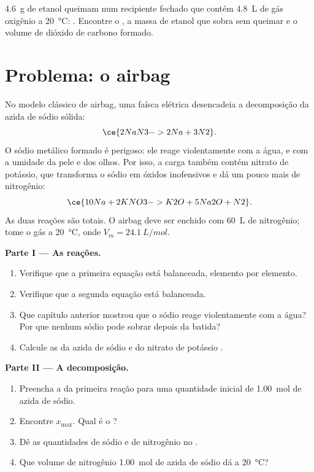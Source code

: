 \begin{exercise}[$\star\star\star$]\label{exo:g10:reaction-progress-table:15}
\qty{4.6}{g} de etanol  queimam num recipiente fechado que
contém \qty{4.8}{L} de gás oxigênio a \qty{20}{\celsius}:
. Encontre o , a massa
de etanol que sobra sem queimar e o volume de dióxido de carbono
formado.
\end{exercise}

\section{Problema: o airbag}

\begin{problem}
\label{pb:g10:reaction-progress-table:1}
No modelo clássico de airbag, uma faísca elétrica desencadeia a
decomposição da azida de sódio sólida:
\[
  \ce{2NaN3 -> 2Na + 3N2} .
\]
O sódio metálico formado é perigoso: ele reage violentamente com a água,
e com a umidade da pele e dos olhos. Por isso, a carga também contém
nitrato de potássio, que transforma o sódio em óxidos inofensivos e dá
um pouco mais de nitrogênio:
\[
  \ce{10Na + 2KNO3 -> K2O + 5Na2O + N2} .
\]
As duas reações são totais. O airbag deve ser enchido com \qty{60}{L} de
nitrogênio; tome o gás a \qty{20}{\celsius}, onde
$V_m = \qty{24.1}{L/mol}$.

\medskip
\noindent\textbf{Parte I --- As reações.}
\begin{enumerate}
  \item Verifique que a primeira equação está balanceada, elemento por
        elemento.
  \item Verifique que a segunda equação está balanceada.
  \item Que capítulo anterior mostrou que o sódio reage violentamente com
        a água? Por que nenhum sódio pode sobrar depois da batida?
  \item Calcule as  da azida de sódio  e do
        nitrato de potássio .
\end{enumerate}

\medskip
\noindent\textbf{Parte II --- A decomposição.}
\begin{enumerate}[resume]
  \item Preencha a  da primeira reação para uma
        quantidade inicial de \qty{1.00}{mol} de azida de sódio.
  \item Encontre $x_{\max}$. Qual é o ?
  \item Dê as quantidades de sódio e de nitrogênio no .
  \item Que volume de nitrogênio \qty{1.00}{mol} de azida de sódio dá a
        \qty{20}{\celsius}?
\end{enumerate}


\end{problem}
